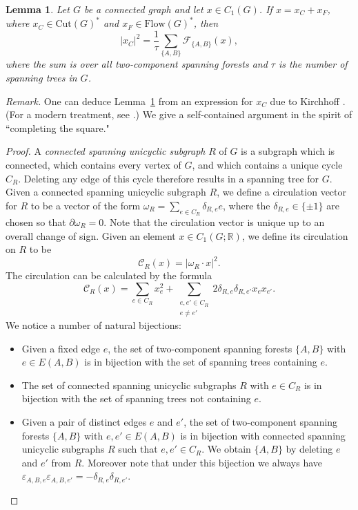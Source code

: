 \documentclass[11pt]{amsart}
\newtheorem{lem}[thm]{Lemma}
\numberwithin{equation}{section}
\def\Cut{{\mathrm{Cut}}}
\def\Flow{{\mathrm{Flow}}}
\def\bR{{\mathbb R}}
\def\Cut{{\mathrm{Cut}}}
\def\Flow{{\mathrm{Flow}}}
\newcommand{\norm}[1]{\left| #1 \right|^2}
\begin{document}
\begin{lem}
\label{lem:length}
Let $G$ be a connected graph and let $x\in C_1(G)$. If $x=x_C+x_F$, where $x_C\in \Cut(G)^*$ and $x_F\in \Flow(G)^*$, then
\[
\norm{x_C}= \frac{1}{\tau} \sum_{\{A,B\}} \mathcal{F}_{\{A,B\}}(x),
\]
where the sum is over all two-component spanning forests and $\tau$ is the number of spanning trees in $G$.
\end{lem}

\noindent
{\em Remark.}
One can deduce Lemma~\ref{lem:length} from an expression for $x_C$ due to Kirchhoff \cite{Kirchhoff1847}.
(For a modern treatment, see \cite[Theorem 14.8.1]{GodsilRoyle2001}.)
We give a self-contained argument in the spirit of ``completing the square."

\begin{proof}
A \emph{connected spanning unicyclic subgraph} $R$ of $G$ is a subgraph which is connected, which contains every vertex of $G$, and which contains a unique cycle $C_R$.
Deleting any edge of this cycle therefore results in a spanning tree for $G$. Given a connected spanning unicyclic subgraph $R$, we define a circulation vector for $R$ to be a vector of the form $\omega_R = \sum_{e\in C_R} \delta_{R,e} e$, where the $\delta_{R,e}\in \{\pm 1\}$ are chosen so that $\partial \omega_R=0$. Note that the circulation vector is unique up to an overall change of sign. Given an element $x\in C_1(G;\bR)$, we define its circulation on $R$ to be 
\[\mathcal{C}_{R}(x)=|\omega_R\cdot x|^2.\]
The circulation can be calculated by the formula
\begin{equation}\label{eq:circulation_formula}
\mathcal{C}_{R}(x)=\sum_{e\in C_R} x_e^2 + \sum_{\substack{e,e'\in C_R\\ e\neq e'}} 2\delta_{R,e}\delta_{R,e'} x_e x_{e'}.
\end{equation}
We notice a number of natural bijections:
\begin{itemize}
    \item Given a fixed edge $e$, the set of two-component spanning forests $\{A,B\}$ with $e\in E(A,B)$ is in bijection with the set of spanning trees containing $e$.
    \item The set of connected spanning unicyclic subgraphs $R$ with $e\in C_R$ is in bijection with the set of spanning trees not containing $e$.
    \item Given a pair of distinct edges $e$ and $e'$, the set of two-component spanning forests $\{A,B\}$ with $e,e'\in E(A,B)$ is in bijection with connected spanning unicyclic subgraphs $R$ such that $e,e'\in C_R$. We obtain $\{A,B\}$ by deleting $e$ and $e'$ from $R$. Moreover note that under this bijection we always have $\varepsilon_{A,B,e}\varepsilon_{A,B,e'}=-\delta_{R,e}\delta_{R,e'}$.

\end{itemize}
\end{proof}
\end{document}
